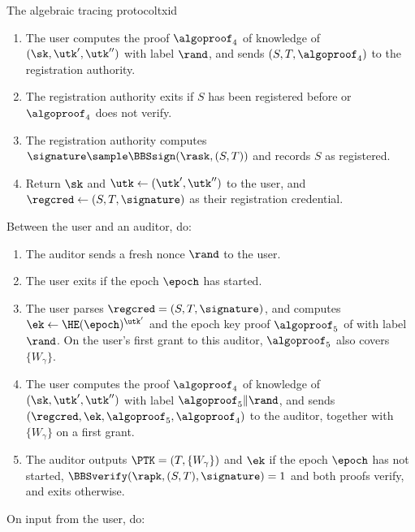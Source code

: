 \begin{protocolbox}{The algebraic tracing protocol}{txid}
\begin{description}
\begin{enumerate}
	\item The user computes the proof $\algoproof_4$ of knowledge of
$(\sk,\utk',\utk'')$ with label $\rand$, and sends $(S,T,\algoproof_4)$ to the
registration authority.

	\item The registration authority exits if $S$ has been registered before
or $\algoproof_4$ does not verify.

	\item The registration authority computes $\signature \sample
\BBSsign(\rask,(S,T))$ and records $S$ as registered.

	\item Return $\sk$ and $\utk \leftarrow (\utk',\utk'')$ to the user,
and $\regcred \leftarrow (S,T,\signature)$ as their registration credential.

      \end{enumerate}

    \item[$(\PTK,\ek) \sample \IDgrant(\crs,\sk,\utk,\regcred,\epoch)$ :]
Between the user and an auditor, do:

      \begin{enumerate}

	\item The auditor sends a fresh nonce $\rand$ to the user.

	\item The user exits if the epoch $\epoch$ has started.

	\item The user parses $\regcred = (S,T,\signature)$, and computes $\ek
\leftarrow \HE(\epoch)^{\utk'}$ and the epoch key proof $\algoproof_5$ of
 with label $\rand$. On the user's first grant to this
auditor, $\algoproof_5$ also covers $\{W_\gamma\}$.

	\item The user computes the proof $\algoproof_4$ of knowledge of
$(\sk,\utk',\utk'')$ with label $\algoproof_5\|\rand$, and sends
$(\regcred,\ek,\algoproof_5,\algoproof_4)$ to the auditor, together with
$\{W_\gamma\}$ on a first grant.

	\item The auditor outputs $\PTK = (T,\{W_\gamma\})$ and $\ek$ if the
epoch $\epoch$ has not started, $\BBSverify(\rapk,(S,T),\signature) = 1$
and both proofs verify, and exits otherwise.

      \end{enumerate}

    \item[$\tx \sample \IDsubmit(\crs,\sk,\utk,\regcred,\epoch,\payload)$ :] On
input from the user, do:


\end{description}
\end{protocolbox}

